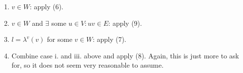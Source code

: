 \begin{enumerate}
\begin{enumerate}
        \begin{enumerate}
            \item $v \in W$: apply (6). 
            \item $v \in W$ and $\exists$ some $u \in V: uv \in E$: apply (9).
            \item $l=\lambda^v(v)$ for some $v \in W$: apply (7). 
            \item Combine case i. and iii. above and apply (8). Again, this is just more to ask for, so it does not seem very reasonable to assume. 
        \end{enumerate}
    \end{enumerate}
\end{enumerate}


